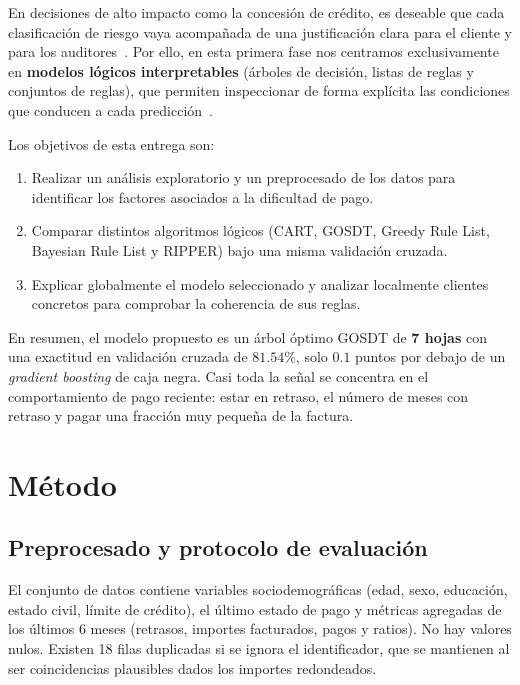\documentclass[a4paper,11pt]{article}
\begin{document}
En decisiones de alto impacto como la concesión de crédito, es deseable que cada clasificación de riesgo vaya acompañada de una justificación clara para el cliente y para los auditores~\cite{rudin2019}. Por ello, en esta primera fase nos centramos exclusivamente en \textbf{modelos lógicos interpretables} (árboles de decisión, listas de reglas y conjuntos de reglas), que permiten inspeccionar de forma explícita las condiciones que conducen a cada predicción~\cite{slidesLogical}.

Los objetivos de esta entrega son:
\begin{enumerate}
    \item Realizar un análisis exploratorio y un preprocesado de los datos para identificar los factores asociados a la dificultad de pago.
    \item Comparar distintos algoritmos lógicos (CART, GOSDT, Greedy Rule List, Bayesian Rule List y RIPPER) bajo una misma validación cruzada.
    \item Explicar globalmente el modelo seleccionado y analizar localmente clientes concretos para comprobar la coherencia de sus reglas.
\end{enumerate}

En resumen, el modelo propuesto es un árbol óptimo GOSDT de \textbf{7 hojas} con una exactitud en validación cruzada de $81.54\%$, solo $0.1$ puntos por debajo de un \textit{gradient boosting} de caja negra. Casi toda la señal se concentra en el comportamiento de pago reciente: estar en retraso, el número de meses con retraso y pagar una fracción muy pequeña de la factura.

\section{Método}

\subsection{Preprocesado y protocolo de evaluación}
El conjunto de datos contiene variables sociodemográficas (edad, sexo, educación, estado civil, límite de crédito), el último estado de pago y métricas agregadas de los últimos 6 meses (retrasos, importes facturados, pagos y ratios). No hay valores nulos. Existen 18 filas duplicadas si se ignora el identificador, que se mantienen al ser coincidencias plausibles dados los importes redondeados.
\end{document}
